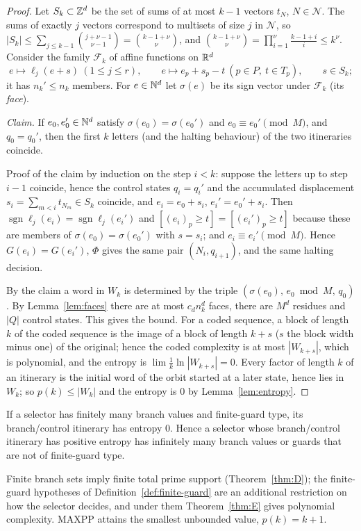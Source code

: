 \begin{proof}
Let $S_k\subset\mathbb{Z}^d$ be the set of sums of at most $k-1$ vectors $t_N$, $N\in\mathcal N$. The sums of exactly $j$ vectors correspond to multisets of size $j$ in $\mathcal N$, so $|S_k|\le\sum_{j\le k-1}\binom{j+\nu-1}{\nu-1}=\binom{k-1+\nu}\nu$, and $\binom{k-1+\nu}{\nu}=\prod_{i=1}^{\nu}\frac{k-1+i}{i}\le k^\nu$. 
Consider the family $\mathcal F_k$ of affine functions on $\mathbb{R}^d$
\[
e\mapsto\ell_j(e+s)\ (1\le j\le r),\qquad e\mapsto e_p+s_p-t\ (p\in P,\ t\in T_p),\qquad s\in S_k;
\]
it has $n_k'\le n_k$ members. For $e\in\mathbb{N}^d$ let $\sigma(e)$ be its sign vector under $\mathcal F_k$ (its \emph{face}).

\emph{Claim.} If $e_0,e_0'\in\mathbb{N}^d$ satisfy $\sigma(e_0)=\sigma(e_0')$ and $e_0\equiv e_0'\pmod M$, and $q_0=q_0'$, then the first $k$ letters (and the halting behaviour) of the two itineraries coincide.

Proof of the claim by induction on the step $i<k$: suppose the letters up to step $i-1$ coincide, hence the control states $q_i=q_i'$ and the accumulated displacement $s_i=\sum_{m<i}t_{N_m}\in S_k$ coincide, and $e_i=e_0+s_i$, $e_i'=e_0'+s_i$. Then $\operatorname{sgn}\ell_j(e_i)=\operatorname{sgn}\ell_j(e_i')$ and $[ (e_i)_p\ge t]=[(e_i')_p\ge t]$ because these are members of $\sigma(e_0)=\sigma(e_0')$ with $s=s_i$; and $e_i\equiv e_i'\pmod M$. Hence $G(e_i)=G(e_i')$, $\Phi$ gives the same pair $(N_i,q_{i+1})$, and the same halting decision.

By the claim a word in $W_k$ is determined by the triple $(\sigma(e_0),\,e_0\bmod M,\,q_0)$. By Lemma~\ref{lem:faces} there are at most $c_dn_k^d$ faces, there are $M^d$ residues and $|Q|$ control states. This gives the bound. 
For a coded sequence, a block of length $k$ of the coded sequence is the image of a block of length $k+s$ ($s$ the block width minus one) of the original; hence the coded complexity is at most $|W_{k+s}|$, which is polynomial, and the entropy is $\lim\frac1k\ln|W_{k+s}|=0$. Every factor of length $k$ of an itinerary is the initial word of the orbit started at a later state, hence lies in $W_k$; so $p(k)\le|W_k|$ and the entropy is $0$ by Lemma~\ref{lem:entropy}. \end{proof}

\begin{corollary}\label{cor:needs}
If a selector has finitely many branch values and finite-guard type, its branch/control itinerary has entropy $0$. Hence a selector whose branch/control itinerary has positive entropy has infinitely many branch values or guards that are not of finite-guard type.
\end{corollary}
Finite branch sets imply finite total prime support (Theorem~\ref{thm:D}); the finite-guard hypotheses of Definition~\ref{def:finite-guard} are an additional restriction on how the selector decides, and under them Theorem~\ref{thm:E} gives polynomial complexity. \textsf{MAXPP} attains the smallest unbounded value, $p(k)=k+1$.

